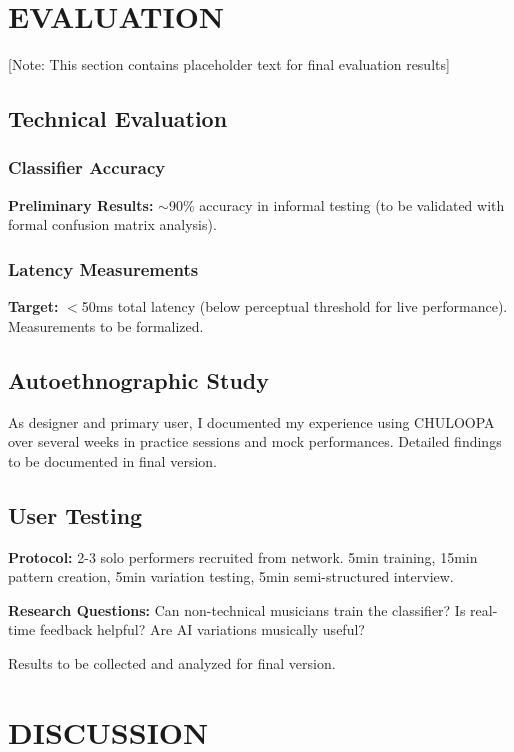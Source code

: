 \documentclass{aimc2026}
\begin{document}
\section{EVALUATION}
\label{sec:evaluation}

[Note: This section contains placeholder text for final evaluation results]

\subsection{Technical Evaluation}

\subsubsection{Classifier Accuracy}

\textbf{Preliminary Results:} $\sim$90\% accuracy in informal testing (to be validated with formal confusion matrix analysis).

\subsubsection{Latency Measurements}

\textbf{Target:} $<$50ms total latency (below perceptual threshold for live performance). Measurements to be formalized.

\subsection{Autoethnographic Study}

As designer and primary user, I documented my experience using CHULOOPA over several weeks in practice sessions and mock performances. Detailed findings to be documented in final version.

\subsection{User Testing}

\textbf{Protocol:} 2-3 solo performers recruited from network. 5min training, 15min pattern creation, 5min variation testing, 5min semi-structured interview.

\textbf{Research Questions:} Can non-technical musicians train the classifier? Is real-time feedback helpful? Are AI variations musically useful?

Results to be collected and analyzed for final version.


\section{DISCUSSION}
\label{sec:discussion}
\end{document}
